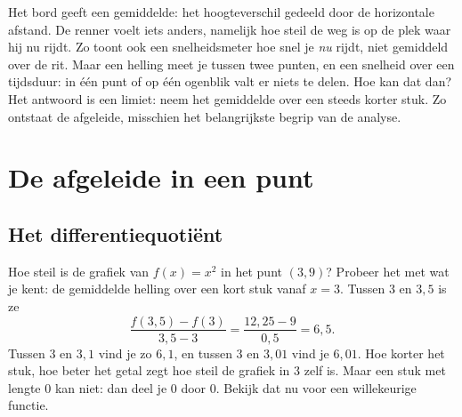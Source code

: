 Het bord geeft een gemiddelde: het hoogteverschil gedeeld door de horizontale afstand. De renner voelt iets anders, namelijk hoe steil de weg is op de plek waar hij nu rijdt. Zo toont ook een snelheidsmeter hoe snel je \textit{nu} rijdt, niet gemiddeld over de rit. Maar een helling meet je tussen twee punten, en een snelheid over een tijdsduur: in één punt of op één ogenblik valt er niets te delen. Hoe kan dat dan? Het antwoord is een limiet: neem het gemiddelde over een steeds korter stuk. Zo ontstaat de afgeleide, misschien het belangrijkste begrip van de analyse.

\begin{oefeningen}[Start]

\end{oefeningen}

\section{De afgeleide in een punt}

\subsection{Het differentiequotiënt}

Hoe steil is de grafiek van $f(x) = x^2$ in het punt $(3, 9)$? Probeer het met wat je kent: de gemiddelde helling over een kort stuk vanaf $x = 3$. Tussen $3$ en $3{,}5$ is ze
\[\frac{f(3{,}5) - f(3)}{3{,}5 - 3} = \frac{12{,}25 - 9}{0{,}5} = 6{,}5 .\]
Tussen $3$ en $3{,}1$ vind je zo $6{,}1$, en tussen $3$ en $3{,}01$ vind je $6{,}01$. Hoe korter het stuk, hoe beter het getal zegt hoe steil de grafiek in $3$ zelf is. Maar een stuk met lengte $0$ kan niet: dan deel je $0$ door $0$. Bekijk dat nu voor een willekeurige functie.


